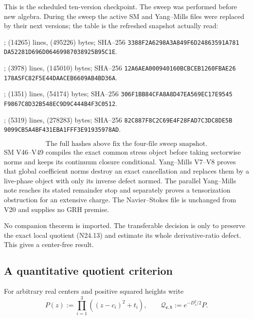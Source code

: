 \documentclass[11pt]{article}
\theoremstyle{definition}
\theoremstyle{remark}
\begin{document}
This is the scheduled ten-version checkpoint.  The sweep was performed
before new algebra.  During the sweep the active SM and Yang--Mills files
were replaced by their next versions; the table is the refreshed snapshot
actually read:
\begin{description}[leftmargin=2.8em,style=nextline]
\item[SM V49.]
;
(14265) lines, (495226) bytes; SHA--256
\texttt{3388F2A6298A3A849F6D24863591A781}\allowbreak
\texttt{DA52281D696D06469987038925B95C1E}.
\item[Yang--Mills V8.]
;
(3978) lines, (145010) bytes; SHA--256
\texttt{12A6AEA000940160BCBCEB1260FBAE26}\allowbreak
\texttt{178A5FC82F5E44DAACEB6609AB4BD36A}.
\item[Parallel Yang--Mills V5.]
;
(1351) lines, (54174) bytes; SHA--256
\texttt{306F1BB84CFA8A8D47EA569EC17E9545}\allowbreak
\texttt{F9867C8D32B548EC9D9C444B4F3C0512}.
\item[Navier--Stokes V26.]
;
(5319) lines, (278283) bytes; SHA--256
\texttt{82C887F8C2C69E4F28FAD7C3DC8DE5B}\allowbreak
\texttt{9099CB5A4BF431EBA1FFF3E91935978AD}.
\end{description}
\[
 \text{The full hashes above fix the four-file sweep snapshot.}
 \tag{N30.1}
\]
SM V46--V49 compiles the exact common stress object before taking
sectorwise norms and keeps its continuum closure conditional.  Yang--Mills
V7--V8 proves that global coefficient norms destroy an exact cancellation
and replaces them by a live-phase object with only its inverse defect
normed.  The parallel Yang--Mills note reaches its stated remainder stop
and separately proves a tensorization obstruction for an extensive charge.
The Navier--Stokes file is unchanged from V20 and supplies no GRH premise.

No companion theorem is imported.  The transferable decision is only to
preserve the exact local quotient \textup{(N24.13)} and estimate its whole
derivative-ratio defect.  This gives a center-free result.

\subsection{A quantitative quotient criterion}

For arbitrary real centers and positive squared heights write
\[
 P(z):=\prod_{i=1}^3((z-c_i)^2+t_i),\qquad
 \mathcal Q_{\bm c,\bm t}:=e^{-D_z^2/2}P.
 \tag{N30.2}
\]
\end{document}
